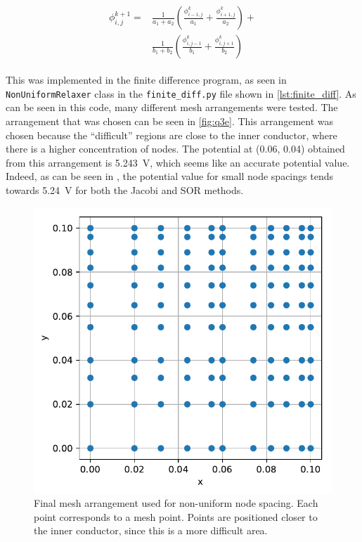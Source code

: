 \documentclass[a4paper,titlepage]{article}
\begin{document}
	\begin{align} \label{eq:non_uniform}
		\begin{split}
			\phi^{k + 1}_{i,j} = 
			&\frac{1}{a_1 + a_2}\left(\frac{\phi^k_{i - 1,j}}{a_1} + \frac{\phi^k_{i + 1,j}}{a_2}\right) + \\
			&\frac{1}{b_1 + b_2}\left(\frac{\phi^k_{i, j - 1}}{b_1} + \frac{\phi^k_{i, j + 1}}{b_2}\right)
		\end{split}
	\end{align}
	
	This was implemented in the finite difference program, as seen in \texttt{NonUniformRelaxer} class in the \texttt{finite_diff.py} file shown in \autoref{lst:finite_diff}. As can be seen in this code, many different mesh arrangements were tested. The arrangement that was chosen can be seen in \autoref{fig:q3e}. This arrangement was chosen because the ``difficult'' regions are close to the inner conductor, where there is a higher concentration of nodes. The potential at (0.06, 0.04) obtained from this arrangement is \SI{5.243}{\volt}, which seems like an accurate potential value. Indeed, as can be seen in , the potential value for small node spacings tends towards \SI{5.24}{\volt} for both the Jacobi and SOR methods.
	
	\begin{figure}[!htb]
		\centering
		\includegraphics[width=\columnwidth]{plots/q3e.pdf}
		\caption
		{Final mesh arrangement used for non-uniform node spacing. Each point corresponds to a mesh point. Points are positioned closer to the inner conductor, since this is a more difficult area.}
		\label{fig:q3e}
	\end{figure}
\end{document}
